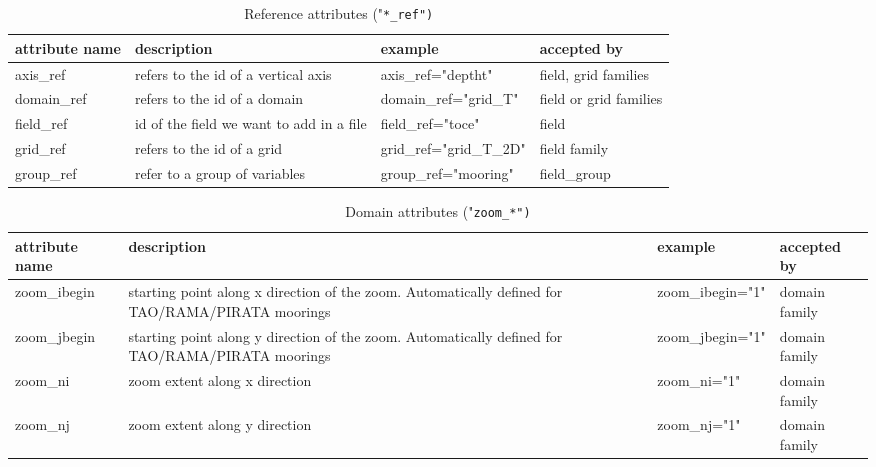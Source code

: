 \documentclass[../tex_main/NEMO_manual]{subfiles}
\begin{document}
\begin{table} \scriptsize
	\begin{tabularx}{\textwidth}{|l|X|l|l|} \hline
		attribute name                           & 
		description                              & 
		example                                  & 
		accepted by            \\ \hline \hline
		axis\_ref                                & 
		refers to the id of a vertical axis      & 
		axis\_ref="deptht"                       & 
		field, grid families   \\	\hline
		domain\_ref                              & 
		refers to the id of a domain             & 
		domain\_ref="grid\_T"                    & 
		field or grid families \\ \hline
		field\_ref                               & 
		id of the field we want to add in a file & 
		field\_ref="toce"                        & 
		field                  \\ \hline
		grid\_ref                                & 
		refers to the id of a grid               & 
		grid\_ref="grid\_T\_2D"                  & 
		field family           \\ \hline
		group\_ref                               & 
		refer to a group of variables            & 
		group\_ref="mooring"                     & 
		field\_group           \\ \hline
	\end{tabularx}
	\caption{Reference attributes ("\tt{*\_ref}")}
\end{table}

\begin{table} \scriptsize
	\begin{tabularx}{\textwidth}{|l|X|l|l|} \hline
		attribute name                                     & 
		description                                        & 
		example                                            & 
		accepted by   \\ \hline \hline
		zoom\_ibegin                                       & 
		starting point along x direction of the zoom.
		Automatically defined for TAO/RAMA/PIRATA moorings & 
		zoom\_ibegin="1"                                   & 
		domain family \\ \hline
		zoom\_jbegin                                       & 
		starting point along y direction of the zoom.
		Automatically defined for TAO/RAMA/PIRATA moorings & 
		zoom\_jbegin="1"                                   & 
		domain family \\ \hline
		zoom\_ni                                           & 
		zoom extent along x direction                      & 
		zoom\_ni="1"                                       & 
		domain family \\ \hline
		zoom\_nj                                           & 
		zoom extent along y direction                      & 
		zoom\_nj="1"                                       & 
		domain family \\ \hline
	\end{tabularx}
	\caption{Domain attributes ("\tt{zoom\_*}")}
\end{table}
\end{document}
